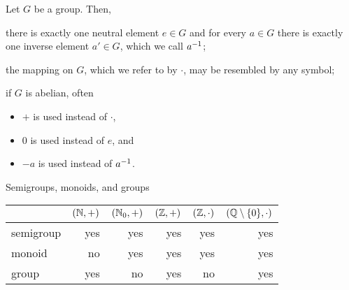 \begin{rmk}
Let $G$ be a group. Then, \begin{rmklist}
    \item there is exactly one neutral element $e \in G$ and for every $a \in G$ there is exactly one inverse element $a' \in G$, which we call $a^{-1}$;
    \item the mapping on $G$, which we refer to by $\cdot$, may be resembled by any symbol;
    \item if $G$ is abelian, often \begin{itemize}
        \item $+$ is used instead of $\cdot$,
        \item $0$ is used instead of $e$, and
        \item $-a$ is used instead of $a^{-1}$.
    \end{itemize}
\end{rmklist}
\end{rmk}

\begin{ex}{Semigroups, monoids, and groups}{}
\begin{center}
\setlength\tabcolsep{5pt}
\begin{tabular}{lrrrrr}
\toprule
 & $(\mathbb{N},+)$ & $(\mathbb{N}_0,+)$ & $(\mathbb{Z},+)$ & $(\mathbb{Z},\cdot)$ & $(\mathbb{Q} \setminus \{0\},\cdot)$ \\
 \midrule
 semigroup & yes & yes & yes & yes & yes \\
 \addlinespace
 monoid & no & yes & yes & yes & yes \\
 \addlinespace
 group & yes & no & yes & no & yes \\
 \bottomrule
\end{tabular}
\end{center}
\end{ex}

